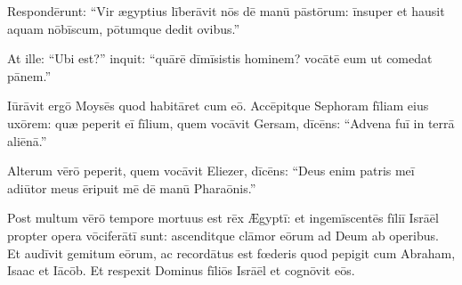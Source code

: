 Respondērunt: ``Vir ægyptius līberāvit nōs dē manū pāstōrum:
īnsuper et hausit aquam nōbīscum, pōtumque dedit ovibus.''

At ille: ``Ubi est?'' inquit: ``quārē dīmīsistis hominem? vocātē eum ut comedat pānem.''

Iūrāvit ergō Moysēs quod habitāret cum eō.
Accēpitque Sephoram fīliam eius uxōrem:
quæ peperit eī fīlium, quem vocāvit Gersam, dīcēns:
``Advena fuī in terrā aliēnā.''

Alterum vērō peperit, quem vocāvit Eliezer, dīcēns:
``Deus enim patris meī adiūtor meus ēripuit mē dē manū Pharaōnis.''

Post multum vērō tempore mortuus est rēx Ægyptī:
et ingemīscentēs fīliī Isrāēl
propter opera vōciferātī sunt:
ascenditque clāmor eōrum ad Deum ab operibus.
Et audīvit gemitum eōrum,
ac recordātus est fœderis quod pepigit cum Abraham, Isaac et Iācōb.
Et respexit Dominus fīliōs Isrāēl et cognōvit eōs.
